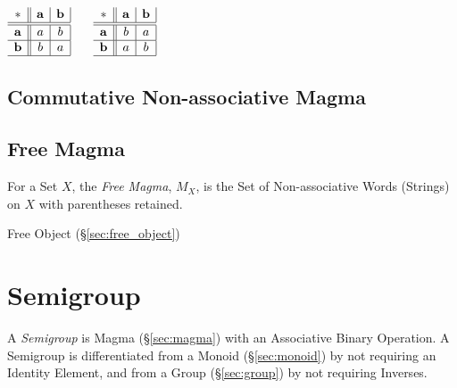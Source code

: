 $\begin{array}{c||c|c|}
  * & \mathbf{a} & \mathbf{b} \\ \hline \hline
  \mathbf{a} & a & b \\ \hline
  \mathbf{b} & b & a \\ \hline
\end{array}$ $\quad$ $\begin{array}{c||c|c|}
  * & \mathbf{a} & \mathbf{b} \\ \hline \hline
  \mathbf{a} & b & a \\ \hline
  \mathbf{b} & a & b \\ \hline
\end{array}$



\subsection{Commutative Non-associative Magma}\label{sec:commutative_magma}

\subsection{Free Magma}\label{sec:free_magma}

For a Set $X$, the \emph{Free Magma}, $M_X$, is the Set of
Non-associative Words (Strings) on $X$ with parentheses retained.

Free Object (\S\ref{sec:free_object})



\section{Semigroup}\label{sec:semigroup}

A \emph{Semigroup} is Magma (\S\ref{sec:magma}) with an Associative
Binary Operation. A Semigroup is differentiated from a Monoid
(\S\ref{sec:monoid}) by not requiring an Identity Element, and from
a Group (\S\ref{sec:group}) by not requiring Inverses.



